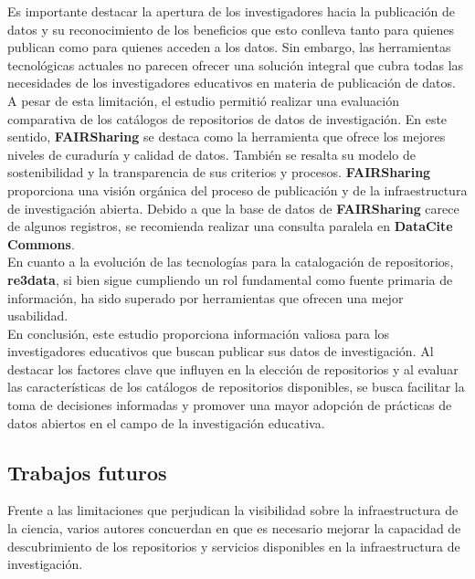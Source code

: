 \documentclass[runningheads]{llncs}
\begin{document}
Es importante destacar la apertura de los investigadores hacia la publicación de datos y su reconocimiento de los beneficios que esto conlleva tanto para quienes publican como para quienes acceden a los datos. Sin embargo, las herramientas tecnológicas actuales no parecen ofrecer una solución integral que cubra todas las necesidades de los investigadores educativos en materia de publicación de datos.\\

A pesar de esta limitación, el estudio permitió realizar una evaluación comparativa de los catálogos de repositorios de datos de investigación. En este sentido, \textbf{FAIRSharing} se destaca como la herramienta que ofrece los mejores niveles de curaduría y calidad de datos. También se resalta su modelo de sostenibilidad y la transparencia de sus criterios y procesos. \textbf{FAIRSharing} proporciona una visión orgánica del proceso de publicación y de la infraestructura de investigación abierta. Debido a que la base de datos de \textbf{FAIRSharing} carece de algunos registros, se recomienda realizar una consulta paralela en \textbf{DataCite Commons}.\\

En cuanto a la evolución de las tecnologías para la catalogación de repositorios, \textbf{re3data}, si bien sigue cumpliendo un rol fundamental como fuente primaria de información, ha sido superado por herramientas que ofrecen una mejor usabilidad.\\

En conclusión, este estudio proporciona información valiosa para los investigadores educativos que buscan publicar sus datos de investigación. Al destacar los factores clave que influyen en la elección de repositorios y al evaluar las características de los catálogos de repositorios disponibles, se busca facilitar la toma de decisiones informadas y promover una mayor adopción de prácticas de datos abiertos en el campo de la investigación educativa.\\

\subsection*{Trabajos futuros}

Frente a las limitaciones que perjudican la visibilidad sobre la infraestructura de la ciencia, varios autores concuerdan en que es necesario mejorar la capacidad de descubrimiento de los repositorios y servicios disponibles en la infraestructura de investigación. \citep{Huber2024FAIR}\\
\end{document}
